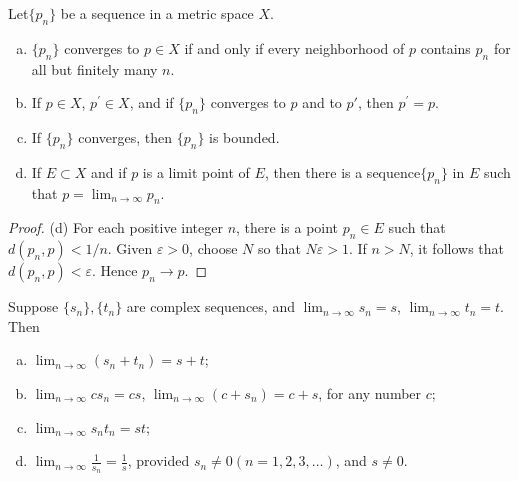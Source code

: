 
\begin{thm}\label{thm:3.2}
    Let$\{p_n\}$ be a sequence in a metric space $X$.
    \begin{enumerate}[(a)]
        \item $\{p_n\}$ converges to $p \in X$ if and only if every neighborhood of $p$ contains $p_n$ for all but finitely many $n$.
        \item If $p\in X$, $p^\prime \in X$, and if $\{p_n\}$ converges to $p$ and to $p'$, then $p^\prime =p$.
        \item If $\{p_n\}$ converges, then $\{p_n\}$ is bounded.
        \item If $E \subset X$ and if $p$ is a limit point of $E$, then there is a sequence$\{p_n\}$ in $E$ such that $p = \lim_{n \to \infty} p_n$.
    \end{enumerate}
\end{thm}

\begin{proof}
    (d) For each positive integer $n$, there is a point $p_n \in E$ such that $d(p_n,p) <1/n$. Given $\varepsilon > 0$, choose $N$ so that $N \varepsilon >1$. If $n>N$, it follows that $d(p_n, p) <\varepsilon$. Hence $p_n \rightarrow p$.
\end{proof}

\begin{thm}\label{thm:3.3}
    Suppose $\{s_n\}, \{t_n\}$ are complex sequences, and 
    $\lim_{n \to \infty} s_n = s$,
    $\lim_{n \to \infty} t_n = t$.
    Then
    \begin{enumerate}[(a)]
        \item $\lim_{n \to \infty} (s_n + t_n) = s + t$;
        \item $\lim_{n \to \infty} c s_n = cs$, $\lim_{n \to \infty} (c + s_n) = c + s$, for any number $c$;
        \item $\lim_{n \to \infty} s_n t_n = st$;
        \item $\lim_{n \to \infty} \frac{1}{s_n} = \frac{1}{s}$, provided $s_n \neq 0(n = 1,2,3,\dots)$, and $s \neq 0$.
    \end{enumerate}
\end{thm}


